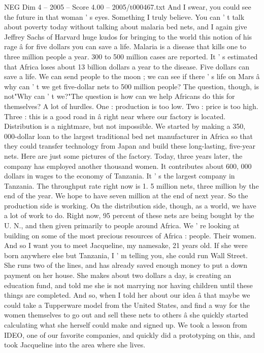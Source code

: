 \begin{textsample}{NEG Dim 4 – 2005 – Score 4.00 – 2005/t000467.txt}
And I swear, you could see the future in that woman ' s eyes.
Something I truly believe.
You can ' t talk about poverty today without talking about malaria bed nets, and I again give Jeffrey Sachs of Harvard huge kudos for bringing to the world this notion of his rage â for five dollars you can save a life.
Malaria is a disease that kills one to three million people a year. 300 to 500 million cases are reported.
It ' s estimated that Africa loses about 13 billion dollars a year to the disease.
Five dollars can save a life.
We can send people to the moon ; we can see if there ' s life on Mars â why can ' t we get five-dollar nets to 500 million people?
The question, though, is not"Why can ' t we?"The question is how can we help Africans do this for themselves?
A lot of hurdles.
One : production is too low.
Two : price is too high.
Three : this is a good road in â right near where our factory is located.
Distribution is a nightmare, but not impossible.
We started by making a 350, 000-dollar loan to the largest traditional bed net manufacturer in Africa so that they could transfer technology from Japan and build these long-lasting, five-year nets.
Here are just some pictures of the factory.
Today, three years later, the company has employed another thousand women.
It contributes about 600, 000 dollars in wages to the economy of Tanzania.
It ' s the largest company in Tanzania.
The throughput rate right now is 1. 5 million nets, three million by the end of the year.
We hope to have seven million at the end of next year.
So the production side is working.
On the distribution side, though, as a world, we have a lot of work to do.
Right now, 95 percent of these nets are being bought by the U.
N., and then given primarily to people around Africa.
We ' re looking at building on some of the most precious resources of Africa : people.
Their women.
And so I want you to meet Jacqueline, my namesake, 21 years old.
If she were born anywhere else but Tanzania, I ' m telling you, she could run Wall Street.
She runs two of the lines, and has already saved enough money to put a down payment on her house.
She makes about two dollars a day, is creating an education fund, and told me she is not marrying nor having children until these things are completed.
And so, when I told her about our idea â that maybe we could take a Tupperware model from the United States, and find a way for the women themselves to go out and sell these nets to others â she quickly started calculating what she herself could make and signed up.
We took a lesson from IDEO, one of our favorite companies, and quickly did a prototyping on this, and took Jacqueline into the area where she lives.

\end{textsample}
